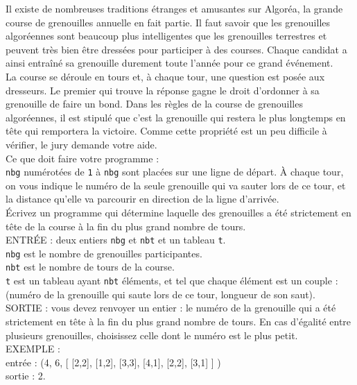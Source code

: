 Il existe de nombreuses traditions étranges et amusantes sur Algoréa, la grande course de 
grenouilles annuelle en fait partie. Il faut savoir que les grenouilles algoréennes sont beaucoup 
plus intelligentes que les grenouilles terrestres et peuvent très bien être dressées pour participer 
à des courses. Chaque candidat a ainsi entraîné sa grenouille durement toute l'année pour ce grand 
événement.\\
La course se déroule en tours et, à chaque tour, une question est posée aux dresseurs. Le premier 
qui trouve la réponse gagne le droit d'ordonner à sa grenouille de faire un bond. Dans les règles de 
la course de grenouilles algoréennes, il est stipulé que c'est la grenouille qui restera le plus 
longtemps en tête qui remportera la victoire. Comme cette propriété est un peu difficile à vérifier, 
le jury demande votre aide.\\
Ce que doit faire votre programme :\\

\noindent \texttt{nbg} numérotées de \texttt{1} à \texttt{nbg} sont placées sur une ligne 
de départ. À chaque tour, on vous indique le numéro de la seule grenouille qui va sauter lors de ce 
tour, et la distance qu'elle va parcourir en direction de la ligne d'arrivée.\\
Écrivez un programme qui détermine laquelle des grenouilles a été strictement en tête de la course 
à la fin du plus grand nombre de tours.\\

\noindent ENTRÉE : deux entiers \texttt{nbg} et \texttt{nbt} et un tableau \texttt{t}.\\
\texttt{nbg} est le nombre de grenouilles participantes.\\
\texttt{nbt} est le nombre de tours de la course.\\
\texttt{t} est un tableau ayant \texttt{nbt} éléments, et tel que chaque élément est un couple : 
(numéro de la grenouille qui saute lors de ce tour, longueur de son saut).\\
\noindent SORTIE : vous devez renvoyer un entier : le numéro de la grenouille qui a 
été strictement en tête à la fin du plus grand nombre de tours. En cas d'égalité entre plusieurs 
grenouilles, choisissez celle dont le numéro est le plus petit.\\

\noindent EXEMPLE :\\
entrée : (4, 6, [ [2,2], [1,2], [3,3], [4,1], [2,2], [3,1] ] )\\
sortie : 2.